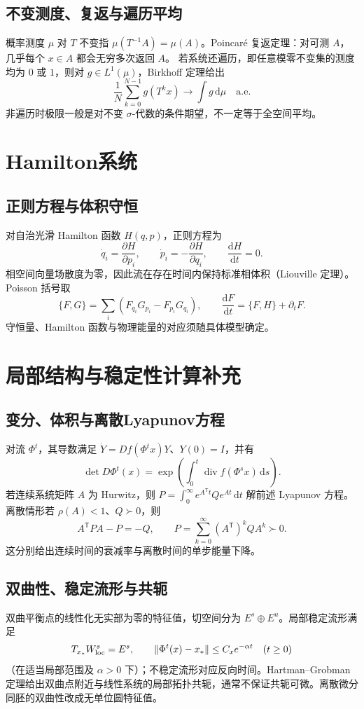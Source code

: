 \documentclass[../main.tex]{subfiles}
\begin{document}
\subsection{不变测度、复返与遍历平均}
概率测度 $\mu$ 对 $T$ 不变指 $\mu(T^{-1}A)=\mu(A)$。Poincaré 复返定理：对可测 $A$，几乎每个 $x\in A$ 都会无穷多次返回 $A$。
若系统还遍历，即任意模零不变集的测度均为 $0$ 或 $1$，则对 $g\in L^1(\mu)$，Birkhoff 定理给出
\[
\frac1N\sum_{k=0}^{N-1}g(T^kx)\to\int g\,\mathrm d\mu\quad\text{a.e.}
\]
非遍历时极限一般是对不变 $\sigma$-代数的条件期望，不一定等于全空间平均。
\section{Hamilton系统}
\subsection{正则方程与体积守恒}
对自治光滑 Hamilton 函数 $H(q,p)$，正则方程为
\[
\dot q_i=\frac{\partial H}{\partial p_i},\qquad
\dot p_i=-\frac{\partial H}{\partial q_i},\qquad\frac{\mathrm dH}{\mathrm dt}=0.
\]
相空间向量场散度为零，因此流在存在时间内保持标准相体积（Liouville 定理）。Poisson 括号取
\[
\{F,G\}=\sum_i(F_{q_i}G_{p_i}-F_{p_i}G_{q_i}),\qquad
\frac{\mathrm dF}{\mathrm dt}=\{F,H\}+\partial_tF.
\]
守恒量、Hamilton 函数与物理能量的对应须随具体模型确定。
\section{局部结构与稳定性计算补充}
\subsection{变分、体积与离散Lyapunov方程}
对流 $\Phi^t$，其导数满足 $\dot Y=Df(\Phi^tx)Y$、$Y(0)=I$，并有
\[
\det D\Phi^t(x)=\exp\left(\int_0^t\operatorname{div}f(\Phi^sx)\,\mathrm ds\right).
\]
若连续系统矩阵 $A$ 为 Hurwitz，则 $P=\int_0^\infty e^{A^{\mathsf T}t}Qe^{At}\,\mathrm dt$ 解前述 Lyapunov 方程。离散情形若 $\rho(A)<1$、$Q\succ0$，则
\[
A^{\mathsf T}PA-P=-Q,\qquad P=\sum_{k=0}^\infty(A^{\mathsf T})^kQA^k\succ0.
\]
这分别给出连续时间的衰减率与离散时间的单步能量下降。
\subsection{双曲性、稳定流形与共轭}
双曲平衡点的线性化无实部为零的特征值，切空间分为 $E^s\oplus E^u$。局部稳定流形满足
\[
T_{x_*}W^s_{\rm loc}=E^s,\qquad
\|\Phi^t(x)-x_*\|\le C_xe^{-\alpha t}\quad(t\ge0)
\]
（在适当局部范围及 $\alpha>0$ 下）；不稳定流形对应反向时间。Hartman--Grobman 定理给出双曲点附近与线性系统的局部拓扑共轭，通常不保证共轭可微。离散微分同胚的双曲性改成无单位圆特征值。
\end{document}
